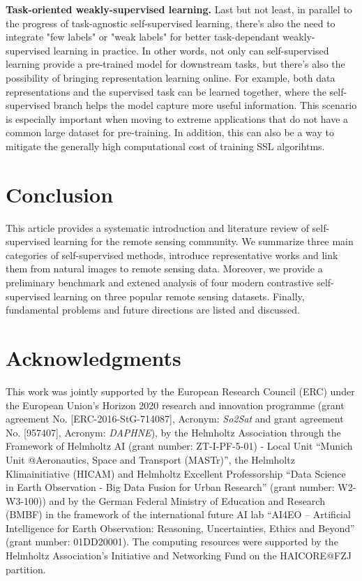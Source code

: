 \documentclass[lettersize,journal]{IEEEtran}
\begin{document}
\textbf{Task-oriented weakly-supervised learning.} Last but not least, in parallel to the progress of task-agnostic self-supervised learning, there's also the need to integrate "few labels" or "weak labels" for better task-dependant weakly-supervised learning in practice. In other words, not only can self-supervised learning provide a pre-trained model for downstream tasks, but there's also the possibility of bringing representation learning online. For example, both data representations and the supervised task can be learned together, where the self-supervised branch helps the model capture more useful information. This scenario is especially important when moving to extreme applications that do not have a common large dataset for pre-training. In addition, this can also be a way to mitigate the generally high computational cost of training SSL algorihtms.





\section{Conclusion}

This article provides a systematic introduction and literature review of self-supervised learning for the remote sensing community. We summarize three main categories of self-supervised methods, introduce representative works and link them from natural images to remote sensing data. Moreover, we provide a preliminary benchmark and extened analysis of four modern contrastive self-supervised learning on three popular remote sensing datasets. Finally, fundamental problems and future directions are listed and discussed.


\section*{Acknowledgments}
This work was jointly supported by the European Research Council (ERC) under the European Union's Horizon 2020 research and innovation programme (grant agreement No. [ERC-2016-StG-714087], Acronym: \textit{So2Sat} and grant agreement No. [957407], Acronym: \textit{DAPHNE}), by the Helmholtz Association through the Framework of Helmholtz AI (grant number: ZT-I-PF-5-01) - Local Unit “Munich Unit @Aeronautics, Space and Transport (MASTr)”, the Helmholtz Klimainitiative (HICAM) and Helmholtz Excellent Professorship “Data Science in Earth Observation - Big Data Fusion for Urban Research” (grant number: W2-W3-100)) and by the German Federal Ministry of Education and Research (BMBF) in the framework of the international future AI lab “AI4EO – Artificial Intelligence for Earth Observation: Reasoning, Uncertainties, Ethics and Beyond” (grant number: 01DD20001). The computing resources were supported by the Helmholtz Association's Initiative and Networking Fund on the HAICORE@FZJ partition.
\end{document}
